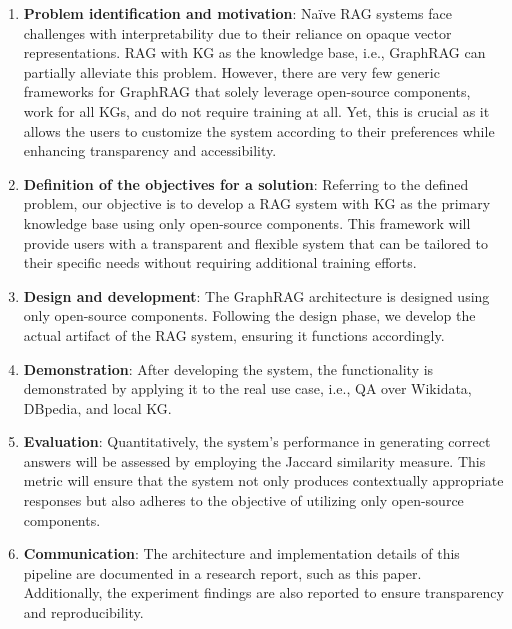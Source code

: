 \begin{enumerate}
    \item \textbf{Problem identification and motivation}: Na\"{i}ve RAG systems face challenges with interpretability due to their reliance on opaque vector representations. RAG with KG as the knowledge base, i.e., GraphRAG can partially alleviate this problem. However, there are very few generic frameworks for GraphRAG that solely leverage open-source components, work for all KGs, and do not require training at all. Yet, this is crucial as it allows the users to customize the system according to their preferences while enhancing transparency and accessibility.
    \item \textbf{Definition of the objectives for a solution}: Referring to the defined problem, our objective is to develop a RAG system with KG as the primary knowledge base using only open-source components. This framework will provide users with a transparent and flexible system that can be tailored to their specific needs without requiring additional training efforts.
    \item \textbf{Design and development}: The GraphRAG architecture is designed using only open-source components. Following the design phase, we develop the actual artifact of the RAG system, ensuring it functions accordingly.
    \item \textbf{Demonstration}: After developing the system, the functionality is demonstrated by applying it to the real use case, i.e., QA over Wikidata, DBpedia, and local KG.
    \item \textbf{Evaluation}: Quantitatively, the system's performance in generating correct answers will be assessed by employing the Jaccard similarity measure. This metric will ensure that the system not only produces contextually appropriate responses but also adheres to the objective of utilizing only open-source components.
    \item \textbf{Communication}: The architecture and implementation details of this pipeline are documented in a research report, such as this paper. Additionally, the experiment findings are also reported to ensure transparency and reproducibility.
\end{enumerate}

